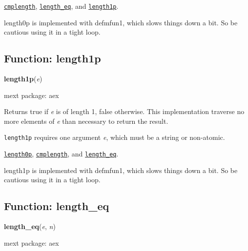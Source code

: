 \documentclass[]{article}
\begin{document}
\vspace{5 pt}


  \hyperlink{cmplength}{{\tt cmplength}}, \hyperlink{length_eq}{{\tt length\_eq}}, and \hyperlink{length1p}{{\tt length1p}}.

\vspace{5 pt}


length0p is implemented with defmfun1, which slows things down a bit. So be cautious using it in a tight loop. 

\vspace{5 pt}


\subsection{Function: length1p\label{sec:length1p}}
\hypertarget{length1p}{}
{\bf length1p}({\it e})


\noindent mext package: aex



\vspace{5 pt}
Returns true if {\it e} is of length 1, false otherwise. This implementation traverse no more elements of {\it e} than necessary to return the result. 

\vspace{5 pt}

   {\tt length1p} requires one argument {\it e}, which must be a string or non-atomic.


\vspace{5 pt}


  \hyperlink{length0p}{{\tt length0p}}, \hyperlink{cmplength}{{\tt cmplength}}, and \hyperlink{length_eq}{{\tt length\_eq}}.

\vspace{5 pt}


length1p is implemented with defmfun1, which slows things down a bit. So be cautious using it in a tight loop. 

\vspace{5 pt}


\subsection{Function: length\_eq\label{sec:length_eq}}
\hypertarget{length_eq}{}
{\bf length\_eq}({\it e}, {\it n})


\noindent mext package: aex
\end{document}
